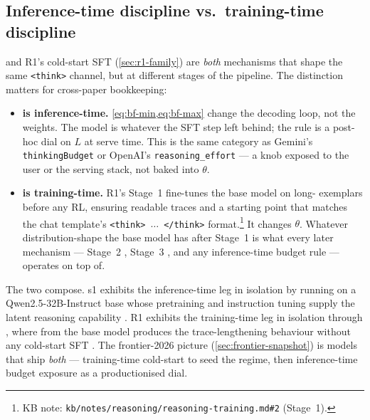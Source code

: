 \subsection{Inference-time discipline vs.\ training-time discipline}
\label{sec:bf-vs-cold-start}

 and R1's cold-start SFT (\cref{sec:r1-family}) are
\emph{both} mechanisms that shape the same \texttt{<think>} channel,
but at different stages of the pipeline. The distinction
matters for cross-paper bookkeeping:

\begin{itemize}
  \item \textbf{ is inference-time.}
        \cref{eq:bf-min,eq:bf-max} change the decoding loop, not the
        weights. The model is whatever the SFT step left behind; the
        rule is a post-hoc dial on $L$ at serve time. This is the same
        category as Gemini's \texttt{thinkingBudget} or OpenAI's
        \texttt{reasoning\_effort} --- a knob exposed to the user or
        the serving stack, not baked into $\theta$.

  \item \textbf{ is training-time.} R1's Stage~1
        \citep[\S 2.3]{deepseek-r1} fine-tunes the base model on
        long- exemplars before any RL, ensuring readable traces and
        a starting point that matches the chat template's
        \texttt{<think>}~$\ldots$~\texttt{</think>}
        format.\footnote{KB note:
        \nolinkurl{kb/notes/reasoning/reasoning-training.md#2} (Stage~1).}
        It changes $\theta$. Whatever distribution-shape the base
        model has after Stage~1 is what every later mechanism ---
        Stage~2 , Stage~3 , and any
        inference-time budget rule --- operates on top of.
\end{itemize}

The two compose. s1 exhibits the inference-time leg in isolation by
running on a Qwen2.5-32B-Instruct base whose pretraining and
instruction tuning supply the latent reasoning capability
\citep[\S 5.1]{s1-2025}. R1 exhibits the training-time leg in
isolation through , where  from the base model produces the
trace-lengthening behaviour without any cold-start SFT
\citep[\S 2.2.4]{deepseek-r1}. The frontier-2026 picture
(\cref{sec:frontier-snapshot}) is models that ship \emph{both} ---
training-time cold-start to seed the regime, then inference-time
budget exposure as a productionised dial.

